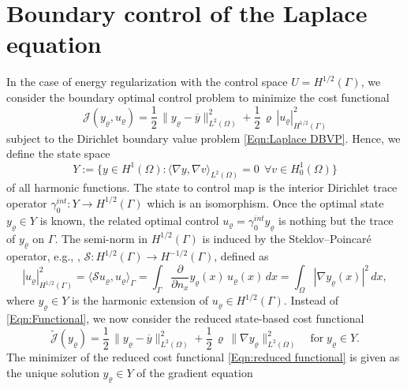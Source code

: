 \documentclass{article}
\numberwithin{equation}{section}
\begin{document}
%
%
\section{Boundary control of the Laplace equation}
\label{Sec:BOCP}
In the case of energy regularization with the control space $U=H^{1/2}(\Gamma)$, 
we consider the boundary optimal
control problem to minimize the cost functional
\begin{equation}\label{Eqn:Functional}
  {\mathcal{J}}(y_\varrho,u_\varrho) =
  \frac{1}{2} \, \| y_\varrho - \overline{y} \|^2_{L^2(\Omega)} +
  \frac{1}{2} \, \varrho \, | u_\varrho |^2_{H^{1/2}(\Gamma)}
\end{equation}
subject to the Dirichlet boundary value problem \eqref{Eqn:Laplace DBVP}.
Hence, we define the state space
\[
  Y := \Big \{ y \in H^1(\Omega) :
  \langle \nabla y , \nabla v \rangle_{L^2(\Omega)} = 0 \;\,
  \forall v \in H^1_0(\Omega) \Big \} 
\]
of all harmonic functions. The state to
control map is the interior Dirichlet trace operator
$\gamma_0^{int} : Y \to H^{1/2}(\Gamma)$ which is an isomorphism. Once the
optimal state $y_\varrho \in Y$ is known, the related optimal control 
$u_\varrho = \gamma_0^{int} y_\varrho$ is nothing but the trace of $y_\varrho$
on $\Gamma$. The semi-norm in $H^{1/2}(\Gamma)$ is induced by the
Steklov--Poincar\'e operator, e.g.,
\cite{Agoshkov1985,QuarteroniValli1999,Steinbach:2008NumericalApprox},
${\mathcal{S}} : H^{1/2}(\Gamma) \to H^{-1/2}(\Gamma)$, defined as
\[
  |u_\varrho|^2_{H^{1/2}(\Gamma)} = \langle
  {\mathcal{S}} u_\varrho , u_\varrho \rangle_\Gamma =
  \int_\Gamma \frac{\partial}{\partial n_x} y_\varrho(x) \, u_\varrho(x) \, dx =
  \int_\Omega |\nabla y_\varrho(x)|^2 \, dx,
\]
where $y_\varrho \in Y$ is the harmonic extension of $u_\varrho \in H^{1/2}(\Gamma)$. 
Instead of \eqref{Eqn:Functional}, we now
consider the reduced state-based cost functional
\begin{equation}\label{Eqn:reduced functional}
  \widetilde{\mathcal{J}}(y_\varrho) =
  \frac{1}{2} \, \| y_\varrho - \overline{y} \|^2_{L^2(\Omega)} +
  \frac{1}{2} \, \varrho \, \| \nabla y_\varrho \|^2_{L^2(\Omega)} \quad
  \mbox{for} \; y_\varrho \in Y.
\end{equation}
The minimizer of the reduced cost functional \eqref{Eqn:reduced functional}
is given as the unique solution $y_\varrho \in Y$ of the gradient equation
\end{document}
